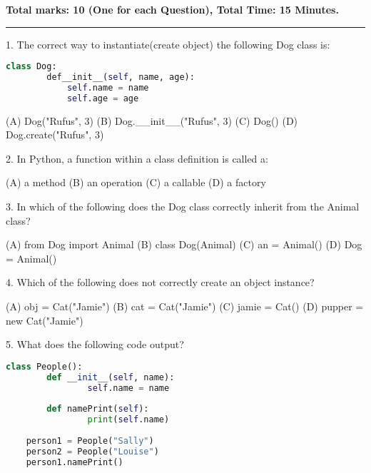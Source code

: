 \documentclass[6pt]{article}
\begin{document}
\large
\begin{center}
\end       {center}
\small
\vspace{10pt}
\begin{center}
\bf Total marks: 10 (One for each Question), Total Time: 15 Minutes.
\end{center}
\vspace{5pt}
\medskip\hrule
\vspace{20pt}
\large
 1. The correct way to instantiate(create object) the following Dog class is:
\vspace{20pt}
\begin{center}
\begin{lstlisting}[language=Python]
	class Dog:
	    def__init__(self, name, age):
	        self.name = name
	        self.age = age
\end{lstlisting}
\end{center}
\vspace{20pt}

(A) Dog("Rufus", 3)         (B) Dog.\_\_init\_\_("Rufus", 3)          (C)  Dog()           (D) Dog.create("Rufus", 3)

\vspace{20pt}
 2. In Python, a function within a class definition is called a:
\vspace{20pt}

(A) a method           (B) an operation           (C)  a callable       (D) a factory

\vspace{20pt}

 3. In which of the following does the Dog class correctly inherit from the Animal class?
\vspace{20pt}

(A) from Dog import Animal (B) class Dog(Animal) (C) an = Animal() (D) Dog = Animal()
\vspace{20pt}

 4.  Which of the following does not correctly create an object instance?
\vspace{20pt}

(A) obj = Cat("Jamie")    (B) cat = Cat("Jamie")   (C)       jamie = Cat()    (D)  pupper = new Cat("Jamie")

\vspace{20pt}
5. What does the following code output?
\begin{center}
\begin{lstlisting}[language=Python]
	class People():		
	    def __init__(self, name):
	    		self.name = name
	
	    def namePrint(self):
	      		print(self.name)
	
	person1 = People("Sally")
	person2 = People("Louise")
	person1.namePrint()
\end{lstlisting}
\end{center}
\vspace{20pt}
\end{document}
